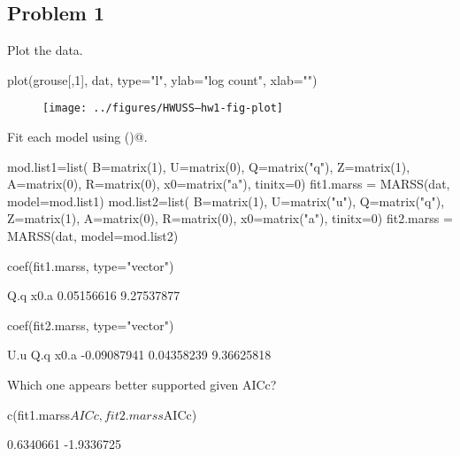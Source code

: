 \subsection*{Problem 1}
\begin{wideenumerate}
\item Plot the data.
\begin{Schunk}
\begin{Sinput}
 plot(grouse[,1], dat, type="l", ylab="log count", xlab="")
\end{Sinput}
\end{Schunk}
\begin{figure}[htp]
\begin{center}
\texttt{[image: ../figures/HWUSS--hw1-fig-plot]}
\end{center}
\end{figure}
\item Fit each model using \verb@MARSS()@.
\begin{Schunk}
\begin{Sinput}
 mod.list1=list(
   B=matrix(1), U=matrix(0), Q=matrix("q"),
   Z=matrix(1), A=matrix(0), R=matrix(0),
   x0=matrix("a"), tinitx=0)
 fit1.marss = MARSS(dat, model=mod.list1)
 mod.list2=list(
   B=matrix(1), U=matrix("u"), Q=matrix("q"),
   Z=matrix(1), A=matrix(0), R=matrix(0),
   x0=matrix("a"), tinitx=0)
 fit2.marss = MARSS(dat, model=mod.list2)
\end{Sinput}
\end{Schunk}
\begin{Schunk}
\begin{Sinput}
 coef(fit1.marss, type="vector")
\end{Sinput}
\begin{Soutput}
       Q.q       x0.a 
0.05156616 9.27537877 
\end{Soutput}
\begin{Sinput}
 coef(fit2.marss, type="vector")
\end{Sinput}
\begin{Soutput}
        U.u         Q.q        x0.a 
-0.09087941  0.04358239  9.36625818 
\end{Soutput}
\end{Schunk}
\item Which one appears better supported given AICc?
\begin{Schunk}
\begin{Sinput}
 c(fit1.marss$AICc, fit2.marss$AICc)
\end{Sinput}
\begin{Soutput}
[1]  0.6340661 -1.9336725

\end{Soutput}
\end{Schunk}
\end{wideenumerate}

